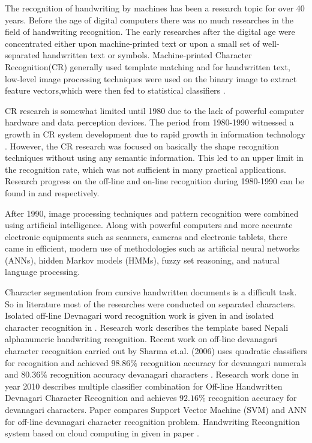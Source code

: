 \documentclass[12pt,a4paper,oneside]{article}
\numberwithin{equation}{section}
\numberwithin{algorithm}{section}
\begin{document}
The recognition of handwriting by machines has been a research topic for over 40 years. Before the age of digital computers there was no much researches in the field of handwriting recognition. The early researches after the digital age were concentrated either upon machine-printed text or upon a small set of well-separated handwritten text or symbols. Machine-printed Character Recognition(CR) generally used template matching and for handwritten text, low-level image processing techniques were used on the binary image to extract feature vectors,which were then fed to statistical classifiers \cite{Suen1980}.

CR research is somewhat limited until 1980 due to the lack of powerful computer hardware and data perception devices. The period from 1980-1990 witnessed a growth in CR system development \cite{Govindan1990} due to rapid growth in information technology \cite{Bozinovic1989}. However, the CR research was focused on basically the shape recognition techniques without using any semantic information. This led to an upper limit in the recognition rate, which was not sufficient in many practical applications. Research progress on the off-line and on-line recognition during 1980-1990 can be found in \cite{Suen1992} and \cite{Suen1990} respectively.

After 1990, image processing techniques and pattern recognition were combined using artificial intelligence. Along with powerful computers and more accurate electronic equipments such as scanners, cameras and electronic tablets, there came in efficient, modern use of methodologies such as artificial neural networks (ANNs), hidden Markov models (HMMs), fuzzy set reasoning, and natural language processing.

Character segmentation from cursive handwritten documents is a difficult task. So in literature most of the researches were conducted on separated characters. Isolated off-line Devnagari word recognition work is given in \cite{Shaw2008} and isolated character recognition in \cite{Sandhya2008}. Research work \cite{Santosh2007} describes the template based Nepali alphanumeric handwriting recognition. Recent work on off-line devanagari character recognition carried out by Sharma et.al. (2006) uses quadratic classifiers for recognition and achieved $98.86\%$ recognition accuracy for devanagari numerals and $80.36\%$ recognition accuracy devanagari characters \cite{Sharma2006}. Research work \cite{Sandhya2010} done in year 2010 describes multiple classifier combination for Off-line Handwritten Devnagari Character Recognition and achieves $92.16\%$ recognition accuracy for devanagari characters. Paper \cite{Sandhya2010_1} compares Support Vector Machine (SVM) and ANN for off-line devanagari character recognition problem. Handwriting Recongnition system based on cloud computing in given in paper \cite{Yan2011}.
\end{document}
